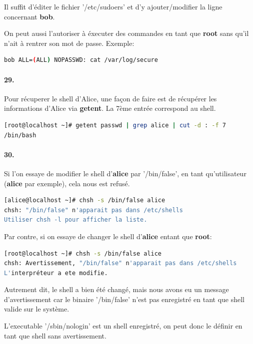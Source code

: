 \documentclass[10pt]{article}
\begin{document}
    Il suffit d'éditer le fichier '/etc/sudoers' et d'y ajouter/modifier la ligne concernant \textbf{bob}.
    
    On peut aussi l'autoriser à éxecuter des commandes en tant que \textbf{root} sans qu'il n'ait à rentrer son mot de passe. Exemple:
    
\begin{lstlisting}[language=bash]
bob ALL=(ALL) NOPASSWD: cat /var/log/secure
\end{lstlisting}
    
    \paragraph{29.}
    Pour récuperer le shell d'Alice, une façon de faire est de récupérer les informations d'Alice via \textbf{getent}.
    La 7ème entrée correspond au shell.
    
\begin{lstlisting}[language=bash]
[root@localhost ~]# getent passwd | grep alice | cut -d : -f 7
/bin/bash
\end{lstlisting}

    \paragraph{30.}
    Si l'on essaye de modifier le shell d'\textbf{alice} par '/bin/false', en tant qu'utilisateur (\textbf{alice} par exemple),
    cela nous est refusé.
\begin{lstlisting}[language=bash]
[alice@localhost ~]# chsh -s /bin/false alice
chsh: "/bin/false" n'apparait pas dans /etc/shells
Utiliser chsh -l pour afficher la liste.
\end{lstlisting}
    
    Par contre, si on essaye de changer le shell d'\textbf{alice} entant que \textbf{root}:
    
\begin{lstlisting}[language=bash]
[root@localhost ~]# chsh -s /bin/false alice
chsh: Avertissement, "/bin/false" n'apparait pas dans /etc/shells
L'interpréteur a ete modifie.
\end{lstlisting}

Autrement dit, le shell a bien été changé, mais nous avons eu un message d'avertissement car le binaire '/bin/false' n'est pas enregistré en tant que shell valide sur le système.

L'executable '/sbin/nologin' est un shell enregistré, on peut donc le définir en tant que shell sans avertissement.
\end{document}
